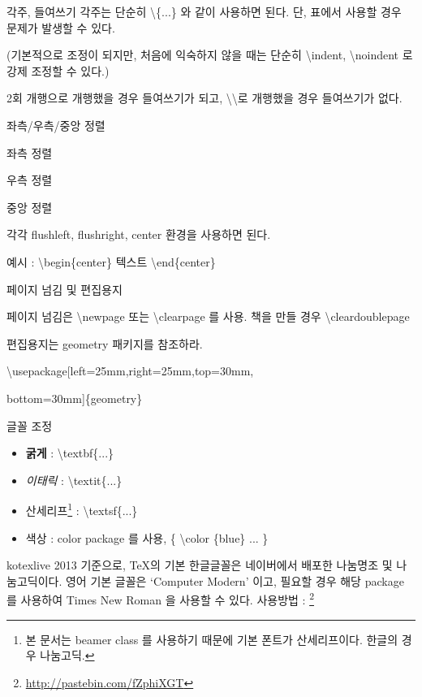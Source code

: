 \documentclass[12pt]{beamer}
\begin{document}
\begin{frame}{각주, 들여쓰기}
	각주는 단순히 \textbackslash \{...\} 와 같이 사용하면 된다. 단, 표에서 사용할 경우 문제가 발생할 수 있다.
	\vspace{1cm}
	
	(기본적으로 조정이 되지만, 처음에 익숙하지 않을 때는 단순히 \textbackslash indent, \textbackslash noindent 로 강제 조정할 수 있다.)
	
	2회 개행으로 개행했을 경우 들여쓰기가 되고, \textbackslash\textbackslash 로 개행했을 경우 들여쓰기가 없다. 
	
\end{frame}
\begin{frame}{좌측/우측/중앙 정렬}
	\begin{flushleft}
		좌측 정렬
	\end{flushleft}
	\begin{flushright}
		우측 정렬
	\end{flushright}
	\begin{center}
		중앙 정렬
	\end{center}
	각각 flushleft, flushright, center 환경을 사용하면 된다.
	
	예시 : \textbackslash begin\{center\} 텍스트	\textbackslash end\{center\}
\end{frame}
\begin{frame}{페이지 넘김 및 편집용지}
	
	페이지 넘김은 \textbackslash newpage 또는 \textbackslash clearpage 를 사용. 책을 만들 경우 \textbackslash cleardoublepage
	\vspace{0.7cm}
	
	편집용지는 geometry 패키지를 참조하라. 
	
	\textbackslash usepackage[left=25mm,right=25mm,top=30mm,
	
	bottom=30mm]\{geometry\}
\end{frame}
\begin{frame}{글꼴 조정}
	\begin{itemize}
		\item \textbf{굵게} : \textbackslash textbf\{...\}
		\item \textit{이태릭} : \textbackslash textit\{...\}
		\item \textsf{산세리프}\footnote{본 문서는 beamer class 를 사용하기 때문에 기본 폰트가 산세리프이다. 한글의 경우 나눔고딕.} : \textbackslash textsf\{...\}
		\item {\color{blue} 색상} : color package 를 사용, \{ \textbackslash color \{blue\} ... \}
	\end{itemize}
	kotexlive 2013 기준으로, \TeX 의 기본 한글글꼴은 네이버에서 배포한 나눔명조 및 나눔고딕이다. 영어 기본 글꼴은 `Computer Modern' 이고, 필요할 경우 해당 package 를 사용하여 Times New Roman 을 사용할 수 있다. 사용방법 : \footnote{\url{http://pastebin.com/fZphiXGT}}
\end{frame}
\end{document}
